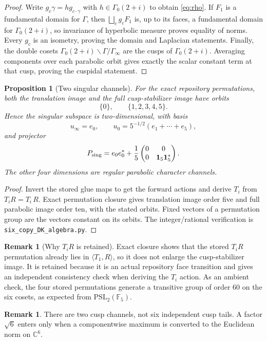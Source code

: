 \documentclass[11pt]{amsart}
\newtheorem{proposition}[theorem]{Proposition}
\theoremstyle{definition}
\newtheorem{remark}[theorem]{Remark}
\newcommand{\CC}{\mathbb C}
\newcommand{\G}{\Gamma}
\newcommand{\Hsub}{\Gamma_0(2+i)}
\begin{document}
\begin{proof}
Write $g_c\gamma=h g_{c\cdot\gamma}$ with $h\in\Hsub$ to obtain
\eqref{eq:rho}. If $F_1$ is a fundamental domain for $\G$, then
$\bigsqcup_c g_cF_1$ is, up to its faces, a fundamental domain for
$\Hsub$, so invariance of hyperbolic measure proves equality of norms.
Every $g_c$ is an isometry, proving the domain and Laplacian statements.
Finally, the double cosets $\Hsub\backslash\G/\G_\infty$ are the cusps of
$\Hsub$. Averaging components over each parabolic orbit gives exactly the
scalar constant term at that cusp, proving the cuspidal statement.
\end{proof}

\begin{proposition}[Two singular channels]\label{prop:channels}
For the exact repository permutations, both the translation image and the
full cusp-stabilizer image have orbits
\[
 \{0\},\qquad\{1,2,3,4,5\}.
\]
Hence the singular subspace is two-dimensional, with basis
\[
 u_\infty=e_0,\qquad
 u_0=5^{-1/2}(e_1+\cdots+e_5),
\]
and projector
\[
 P_{\rm sing}=e_0e_0^*
 +\frac15\begin{pmatrix}0&0\\0&\mathbf1_5\mathbf1_5^*\end{pmatrix}.
\]
The other four dimensions are regular parabolic character channels.
\end{proposition}

\begin{proof}
Invert the stored glue maps to get the forward actions and derive
$T_i$ from $T_iR=T_i\,R$. Exact permutation closure gives translation
image order five and full parabolic image order ten, with the stated
orbits. Fixed vectors of a permutation group are the vectors constant on
its orbits. The integer/rational verification is
\texttt{six\_copy\_DK\_algebra.py}.
\end{proof}

\begin{remark}[Why $T_iR$ is retained]
Exact closure shows that the stored $T_iR$ permutation already lies in
$\langle T_1,R\rangle$, so it does not enlarge the cusp-stabilizer image.
It is retained because it is an actual repository face transition and gives
an independent consistency check when deriving the $T_i$ action. As an
ambient check, the four stored permutations generate a transitive group of
order $60$ on the six cosets, as expected from
$\mathrm{PSL}_2(\mathbb F_5)$.
\end{remark}

\begin{remark}
There are two cusp channels, not six independent cusp tails. A factor
$\sqrt6$ enters only when a componentwise maximum is converted to the
Euclidean norm on $\CC^6$.
\end{remark}
\end{document}
